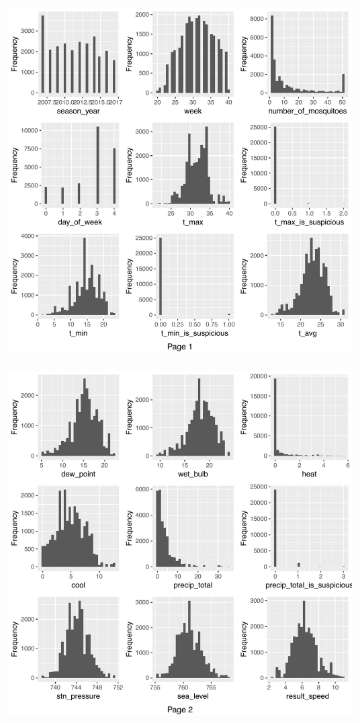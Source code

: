 \begin{figure}[H]
	\centering
	\begin{subfigure}[t]{0.49\textwidth}
		\includegraphics[width=\textwidth]{images/ml/plot_histogram1}
	\end{subfigure}
	\begin{subfigure}[t]{0.49\textwidth}
		\includegraphics[width=\textwidth]{images/ml/plot_histogram2}
	\end{subfigure}
\end{figure}
